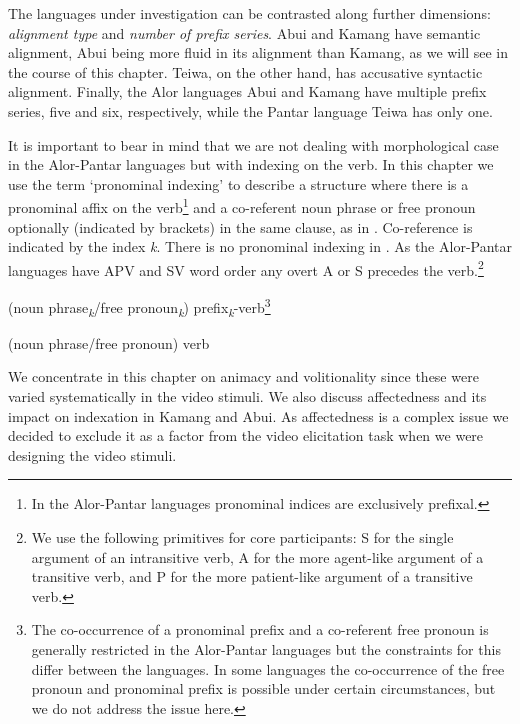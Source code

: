 The languages under investigation can be contrasted along further dimensions: \textit{alignment type} and \textit{number of prefix series}. Abui and Kamang have semantic alignment, Abui being more fluid in its alignment than Kamang, as we will see in the course of this chapter. Teiwa, on the other hand, has accusative syntactic alignment. Finally, the Alor languages Abui and Kamang have multiple prefix series, five and six, respectively, while the Pantar language Teiwa has only one.

It is important to bear in mind that we are not dealing with morphological case in the Alor-Pantar languages but with indexing on the verb. In this chapter we use the term `pronominal indexing' to describe a structure where there is a pronominal affix on the verb\footnote{In the Alor-Pantar languages pronominal indices are exclusively prefixal.} and a co-referent noun phrase or free pronoun optionally (indicated by brackets) in the same clause, as in . Co-reference is indicated by the index \textit{k}. There is no pronominal indexing in . As the Alor-Pantar languages have APV and SV word order any overt A or S precedes the verb.\footnote{We use the following primitives for core participants: S for the single argument of an intransitive verb, A for the more agent-like argument of a transitive verb, and P for the more patient-like argument of a transitive verb.} 

\ea%
\label{bkm:Ref306281876} 
\upshape 
    (noun phrase\textit{\textsubscript{k}}/free pronoun\textit{\textsubscript{k}})    prefix\textit{\textsubscript{k}}{}-verb\footnote{The co-occurrence of a pronominal prefix and a co-referent free pronoun is generally restricted in the Alor-Pantar languages but the constraints for this differ between the languages. In some languages the co-occurrence of the free pronoun and pronominal prefix is possible under certain circumstances, but we do not address the issue here.}
\z


\ea%
\label{bkm:Ref306281880}
\upshape 
(noun phrase/free pronoun)    verb 
\z

    

We concentrate in this chapter on animacy and volitionality since these were varied systematically in the video stimuli. We also discuss affectedness and its impact on indexation in Kamang and Abui. As affectedness is a complex issue \citep{Tsunoda1985,Beavers2011} we decided to exclude it as a factor from the video elicitation task when we were designing the video stimuli. 

